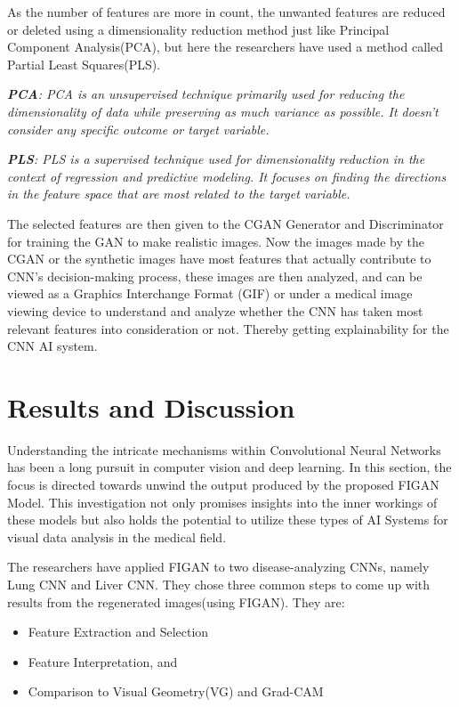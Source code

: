 \noindent
As the number of features are more in count, the unwanted features are reduced or deleted using a dimensionality reduction method just like Principal Component Analysis(PCA), but here the researchers have used a method called Partial Least Squares(PLS).

\noindent
\textit{\textbf{PCA}: PCA is an unsupervised technique primarily used for reducing the dimensionality of data while preserving as much variance as possible. It doesn't consider any specific outcome or target variable.}

\noindent
\textit{\textbf{PLS}: PLS is a supervised technique used for dimensionality reduction in the context of regression and predictive modeling. It focuses on finding the directions in the feature space that are most related to the target variable.}

\noindent
The selected features are then given to the CGAN Generator and Discriminator for training the GAN to make realistic images. Now the images made by the CGAN or the synthetic images have most features that actually contribute to CNN's decision-making process, these images are then analyzed, and can be viewed as a Graphics Interchange Format (GIF) or under a medical image viewing device to understand and analyze whether the CNN has taken most relevant features into consideration or not. Thereby getting explainability for the CNN AI system.

\clearpage

\section{Results and Discussion}

\noindent
Understanding the intricate mechanisms within Convolutional Neural Networks has been a long pursuit in computer vision and deep learning. In this section, the focus is directed towards unwind the output produced by the proposed FIGAN Model. This investigation not only promises insights into the inner workings of these models but also holds the potential to utilize these types of AI Systems for visual data analysis in the medical field.

\noindent
The researchers have applied FIGAN to two disease-analyzing CNNs, namely Lung CNN and Liver CNN. They chose three common steps to come up with results from the regenerated images(using FIGAN). They are:

\begin{itemize}

    \item Feature Extraction and Selection
    
    \item Feature Interpretation, and
    
    \item Comparison to Visual Geometry(VG) and Grad-CAM
    
\end{itemize}

